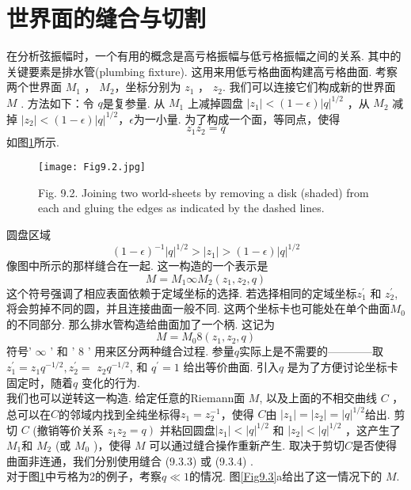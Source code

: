 \section{世界面的缝合与切割}%
在分析弦振幅时，一个有用的概念是高亏格振幅与低亏格振幅之间的关系. 其中的关键要素是排水管(plumbing
fixture). 这用来用低亏格曲面构建高亏格曲面. 考察两个世界面 $M_{1}$ ， $M_{2}$，坐标分别为 $z_{1}$ ， $z_{2}$. 我们可以连接它们构成新的世界面 $M$ . 方法如下：令 $q$是复参量. 从 $M_{1}$ 上减掉圆盘 $\left|z_{1}\right|<(1-\epsilon)|q|^{1 / 2}$ ，从 $M_{2}$ 减掉 $\left|z_{2}\right|<(1-\epsilon)|q|^{1 / 2}$，$\epsilon$为一小量. 为了构成一个面，等同点，使得
\begin{equation}
	z_{1} z_{2}=q
\end{equation}
如图\ref{Fig9.2}所示. 

\begin{figure}
	\begin{center}
		\texttt{[image: Fig9.2.jpg]}\\
		\caption{Fig. 9.2. Joining two world-sheets by removing a disk (shaded) from each and gluing the edges as indicated by the dashed lines.}\label{Fig9.2}
	\end{center}
\end{figure}

圆盘区域
\begin{equation}
	(1-\epsilon)^{-1}|q|^{1 / 2}>\left|z_{1}\right|>(1-\epsilon)|q|^{1 / 2}
\end{equation}
像图中所示的那样缝合在一起. 这一构造的一个表示是
\begin{equation}
	M=M_{1} \infty M_{2}\left(z_{1}, z_{2}, q\right)
\end{equation}
 这个符号强调了相应表面依赖于定域坐标的选择. 若选择相同的定域坐标$z_{1}^{\prime}$ 和 $z_{2}^{\prime}$,将会剪掉不同的圆，并且连接曲面一般不同. 这两个坐标卡也可能处在单个曲面$M_{0}$的不同部分. 那么排水管构造给曲面加了一个柄. 这记为
\begin{equation}
	M=M_{0} 8\left(z_{1}, z_{2}, q\right)
\end{equation}
符号' $\infty$ ' 和 ' 8 ' 用来区分两种缝合过程. 参量$q$实际上是不需要的————取$z_{1}^{\prime}=z_{1} q^{-1 / 2}, z_{2}^{\prime}=$ $z_{2} q^{-1 / 2}$, 和 $q^{\prime}=1$ 给出等价曲面. 引入$q$ 是为了方便讨论坐标卡固定时，随着$q$ 变化的行为.\\
我们也可以逆转这一构造. 给定任意的Riemann面 $M$, 以及上面的不相交曲线 $C$ ，总可以在$C$的邻域内找到全纯坐标得$z_{1}=z_{2}^{-1}$，使得 $C$由 $\left|z_{1}\right|=\left|z_{2}\right|=|q|^{1 / 2}$给出. 剪切 $C$ (撤销等价关系 $\left.z_{1} z_{2}=q\right)$ 并粘回圆盘$\left|z_{1}\right|<|q|^{1 / 2}$ 和 $\left|z_{2}\right|<|q|^{1 / 2}$ ，这产生了 $M_{1}$和 $M_{2}$ (或 $M_{0}$ )，使得 $M$ 可以通过缝合操作重新产生. 取决于剪切$C$是否使得曲面非连通，我们分别使用缝合 (9.3.3) 或 (9.3.4) .\\
对于图\ref{Fig9.2}中亏格为2的例子，考察$q \ll 1$的情况. 图\ref{Fig9.3}a给出了这一情况下的 $M$. 

